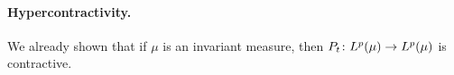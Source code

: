 \paragraph{Hypercontractivity.} We already shown that if $\mu$ is an invariant measure, then $P_t \colon L^p(\mu) \rightarrow L^p(\mu)$ is contractive.


































